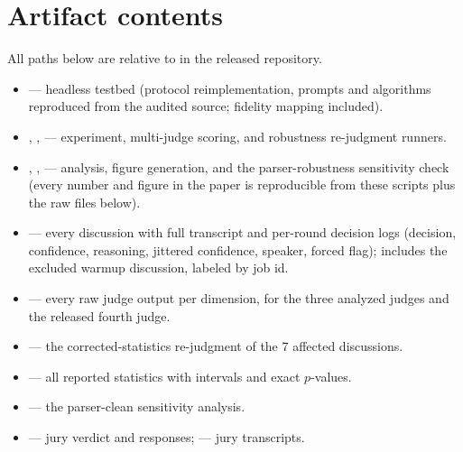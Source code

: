 \section{Artifact contents}

All paths below are relative to  in the released
repository.

\begin{itemize}
\item {} --- headless testbed (protocol
reimplementation, prompts and algorithms reproduced from the audited
source; fidelity mapping included).
\item {}, ,
\newline --- experiment, multi-judge
scoring, and robustness re-judgment runners.
\item {}, ,
\newline --- analysis, figure generation,
and the parser-robustness sensitivity check (every number and figure in
the paper is reproducible from these scripts plus the raw files below).
\item {} --- every discussion with
full transcript and per-round decision logs (decision, confidence,
reasoning, jittered confidence, speaker, forced flag); includes the
excluded warmup discussion, labeled by job id.
\item {} --- every raw judge output per
dimension, for the three analyzed judges and the released fourth judge.
\item {} --- the
corrected-statistics re-judgment of the 7 affected discussions.
\item {} --- all reported
statistics with intervals and exact $p$-values.
\item {} --- the
parser-clean sensitivity analysis.
\item {} --- jury verdict and responses;
 --- jury transcripts.
\end{itemize}
